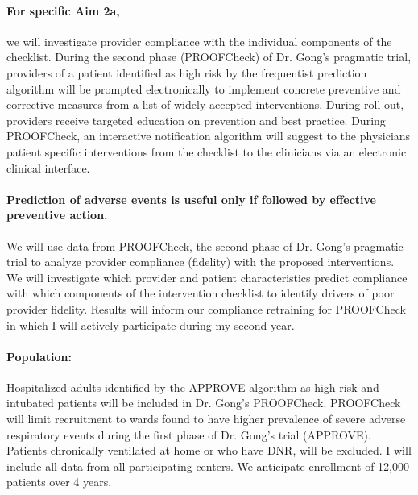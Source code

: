 \documentclass[11pt,notitlepage]{article}
\begin{document}
\paragraph*{For specific Aim 2a,} we will investigate provider compliance with the individual components of the checklist. During the second phase (PROOFCheck) of Dr. Gong's pragmatic trial, providers of a patient identified as high risk by the frequentist prediction algorithm will be prompted electronically to implement concrete preventive and corrective measures from a list of widely accepted interventions. During roll-out, providers receive targeted education on prevention and best practice. During PROOFCheck, an interactive notification algorithm will suggest to the physicians patient specific interventions from the checklist to the clinicians via an electronic clinical interface. 

\paragraph*{Prediction of adverse events is useful only if followed by effective preventive action. } We will use data from PROOFCheck, the second phase of Dr. Gong's pragmatic trial to analyze provider compliance (fidelity) with the proposed interventions. We will investigate which provider and patient characteristics predict compliance with which components of the intervention checklist to identify drivers of poor provider fidelity. Results will inform our compliance retraining for PROOFCheck in which I will actively participate during my second year.

\paragraph*{Population:} 
Hospitalized adults identified by the APPROVE algorithm  as high risk and intubated patients will be included in Dr. Gong's PROOFCheck. PROOFCheck will limit recruitment to wards found to have higher prevalence of severe adverse respiratory events during the first phase of Dr. Gong's trial (APPROVE). Patients chronically ventilated at home or who have DNR, will be excluded. I will include all data from all participating centers. We anticipate enrollment of 12,000 patients over 4 years.
\end{document}
